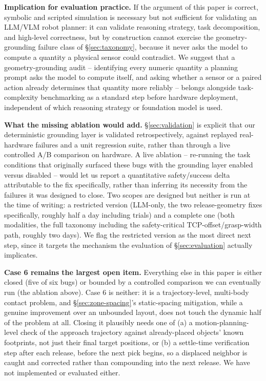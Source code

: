\textbf{Implication for evaluation practice.} If the argument of this
paper is correct, symbolic and scripted simulation is necessary but not
sufficient for validating an LLM/VLM robot planner: it can validate
reasoning strategy, task decomposition, and high-level correctness, but by
construction cannot exercise the geometry-grounding failure class of
\S\ref{sec:taxonomy}, because it never asks the model to compute a
quantity a physical sensor could contradict. We suggest that a
geometry-grounding audit -- identifying every numeric quantity a planning
prompt asks the model to compute itself, and asking whether a sensor or a
paired action already determines that quantity more reliably -- belongs
alongside task-complexity benchmarking as a standard step before hardware
deployment, independent of which reasoning strategy or foundation model is
used.

\textbf{What the missing ablation would add.} \S\ref{sec:validation} is
explicit that our deterministic grounding layer is validated
retrospectively, against replayed real-hardware failures and a unit
regression suite, rather than through a live controlled A/B comparison
on hardware. A live ablation -- re-running the task conditions that
originally surfaced these bugs with the grounding layer enabled versus
disabled -- would let us report a quantitative safety/success delta
attributable to the fix specifically, rather than inferring its
necessity from the failures it was designed to close. Two scopes are
designed but neither is run at the time of writing: a restricted version
(LLM-only, the two release-geometry fixes specifically, roughly half a
day including trials) and a complete one (both modalities, the full
taxonomy including the safety-critical TCP-offset/grasp-width path,
roughly two days). We flag the restricted version as the most direct
next step, since it targets the mechanism the evaluation of
\S\ref{sec:evaluation} actually implicates.

\textbf{Case 6 remains the largest open item.} Everything else in this
paper is either closed (five of six bugs) or bounded by a controlled
comparison we can eventually run (the ablation above). Case 6 is
neither: it is a trajectory-level, multi-body contact problem, and
\S\ref{sec:zone-spacing}'s static-spacing mitigation, while a genuine
improvement over an unbounded layout, does not touch the dynamic half of
the problem at all. Closing it plausibly needs one of (a) a
motion-planning-level check of the approach trajectory against
already-placed objects' known footprints, not just their final target
positions, or (b) a settle-time verification step after each release,
before the next pick begins, so a displaced neighbor is caught and
corrected rather than compounding into the next release. We have not
implemented or evaluated either.

